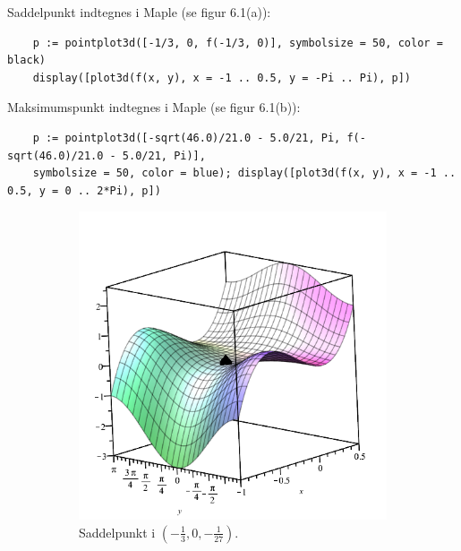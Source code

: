 \documentclass{report}
\begin{document}
Saddelpunkt indtegnes i Maple (se figur 6.1(a)):
\begin{verbatim}
    p := pointplot3d([-1/3, 0, f(-1/3, 0)], symbolsize = 50, color = black)
    display([plot3d(f(x, y), x = -1 .. 0.5, y = -Pi .. Pi), p])
\end{verbatim}
Maksimumspunkt indtegnes i Maple (se figur 6.1(b)):
\begin{verbatim}
    p := pointplot3d([-sqrt(46.0)/21.0 - 5.0/21, Pi, f(-sqrt(46.0)/21.0 - 5.0/21, Pi)], 
    symbolsize = 50, color = blue); display([plot3d(f(x, y), x = -1 .. 0.5, y = 0 .. 2*Pi), p])
\end{verbatim}
\begin{figure}[H]
    \centering
    \begin{subfigure}[b]{0.4\textwidth}
        \includegraphics[width=\textwidth]{saddel.png}
        \caption{Saddelpunkt i $(-\frac{1}{3},0,-\frac{1}{27})$.}
    \end{subfigure}
    ~ %
    \begin{subfigure}[b]{0.4\textwidth}

\end{subfigure}
\end{figure}
\end{document}
